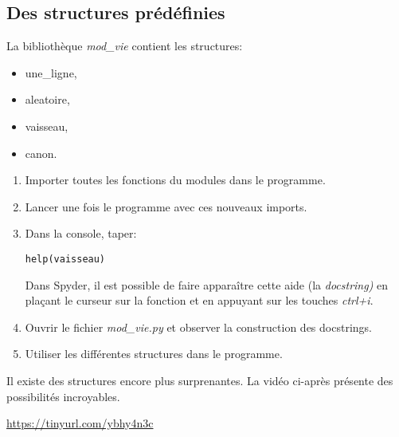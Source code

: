 \documentclass[a4paper,11pt]{article}
\begin{document}
\begin{Form}
\subsection{Des structures prédéfinies}
La bibliothèque \emph{mod\_vie} contient les structures:
\begin{itemize}
\item une\_ligne,
\item aleatoire,
\item vaisseau,
\item canon.
\end{itemize}
\begin{activite}
\begin{enumerate}
\item Importer toutes les fonctions du modules dans le programme.
\item Lancer une fois le programme avec ces nouveaux imports.
\item Dans la console, taper:
\begin{lstlisting}
help(vaisseau)
\end{lstlisting}
Dans Spyder, il est possible de faire apparaître cette aide (la \emph{docstring)} en plaçant le curseur sur la fonction et en appuyant sur les touches \emph{ctrl+i}.
\item Ouvrir le fichier \emph{mod\_vie.py} et observer la construction des docstrings.
\item Utiliser les différentes structures dans le programme.
\end{enumerate}
\end{activite}
Il existe des structures encore plus surprenantes. La vidéo ci-après présente des possibilités incroyables.
\begin{center}
\url{https://tinyurl.com/ybhy4n3c}
\end{center}
\end{Form}
\end{document}

